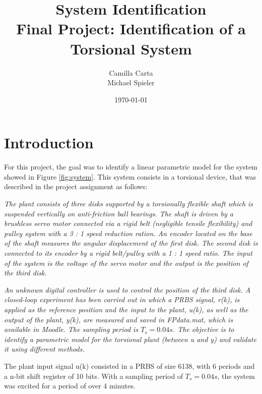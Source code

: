 \documentclass[a4paper,11pt]{article}
\begin{document}
\title{
    System Identification \\
    Final Project: Identification of a Torsional System
}
\author{Camilla Carta \\ Michael Spieler}
\date{\today}
\maketitle


\section{Introduction}
For this project, the goal was to identify a linear parametric model for the system showed in Figure \ref{fig:system}. This system consists in a torsional device, that was described in the project assignment as follows:
\begin{displayquote}
\textit{The plant consists of three disks supported by a torsionally flexible shaft which is suspended vertically on anti-friction ball bearings. The shaft is driven by a brushless servo motor connected via a rigid belt (negligible tensile flexibility) and pulley system with a 3 : 1 speed reduction ration. An encoder located on the base of the shaft measures the angular displacement of the first disk. The second disk is connected to its encoder by a rigid belt/pulley with a 1 : 1 speed ratio. The input of the system is the voltage of the servo motor and the output is the position of the third disk.}

\textit{An unknown digital controller is used to control the position of the third disk. A closed-loop experiment has been carried out in which a PRBS signal, r(k), is applied as the reference position and the input to the plant, u(k), as well as the output of the plant, y(k), are measured and saved in FPdata.mat, which is available in Moodle.
The sampling period is $T_s = 0.04s$. The objective is to identify a parametric model for the torsional plant (between u and y) and validate it using different methods.} 
\end{displayquote}

The plant input signal u(k) consisted in a PRBS of size 6138, with 6 periods and a n-bit shift register of 10 bits. With a sampling period of $T_s = 0.04s$, the system was excited for a period of over 4 minutes.
\end{document}
